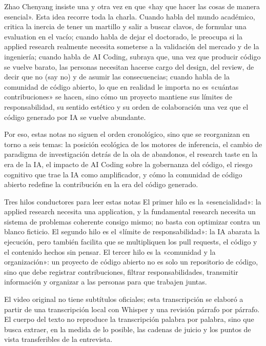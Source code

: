 \documentclass[a4paper]{article}
\begin{document}
Zhao Chenyang insiste una y otra vez en que «hay que hacer las cosas de manera esencial». Esta idea recorre toda la charla. Cuando habla del mundo académico, critica la inercia de tener un martillo y salir a buscar clavos, de formular una evaluation en el vacío; cuando habla de dejar el doctorado, le preocupa si la applied research realmente necesita someterse a la validación del mercado y de la ingeniería; cuando habla de AI Coding, subraya que, una vez que producir código se vuelve barato, las personas necesitan hacerse cargo del design, del review, de decir que no (say no) y de asumir las consecuencias; cuando habla de la comunidad de código abierto, lo que en realidad le importa no es «cuántas contribuciones» se hacen, sino cómo un proyecto mantiene sus límites de responsabilidad, su sentido estético y su orden de colaboración una vez que el código generado por IA se vuelve abundante.

Por eso, estas notas no siguen el orden cronológico, sino que se reorganizan en torno a seis temas: la posición ecológica de los motores de inferencia, el cambio de paradigma de investigación detrás de la ola de abandonos, el research taste en la era de la IA, el impacto de AI Coding sobre la gobernanza del código, el riesgo cognitivo que trae la IA como amplificador, y cómo la comunidad de código abierto redefine la contribución en la era del código generado.

\begin{importantbox}{Tres hilos conductores para leer estas notas}
El primer hilo es la «esencialidad»: la applied research necesita una application, y la fundamental research necesita un sistema de problemas coherente consigo mismo; no basta con optimizar contra un blanco ficticio. El segundo hilo es el «límite de responsabilidad»: la IA abarata la ejecución, pero también facilita que se multipliquen los pull requests, el código y el contenido hechos sin pensar. El tercer hilo es la «comunidad y la organización»: un proyecto de código abierto no es solo un repositorio de código, sino que debe registrar contribuciones, filtrar responsabilidades, transmitir información y organizar a las personas para que trabajen juntas.
\end{importantbox}

El video original no tiene subtítulos oficiales; esta transcripción se elaboró a partir de una transcripción local con Whisper y una revisión párrafo por párrafo. El cuerpo del texto no reproduce la transcripción palabra por palabra, sino que busca extraer, en la medida de lo posible, las cadenas de juicio y los puntos de vista transferibles de la entrevista.
\end{document}
